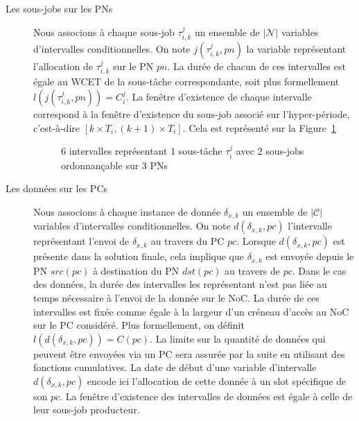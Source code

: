 \documentclass[main.tex]{subfiles}
\begin{document}
\begin{description}
    \item[Les sous-jobs sur les PNs]
        Nous associons à chaque sous-job $\tau_{i,k}^j$ un ensemble de $|\mathcal{N}|$ variables d'intervalles conditionnelles. On note $j( \tau_{i,k}^j , pn )$ la variable représentant l'allocation de $\tau_{i,k}^j$ sur le PN $pn$. La durée de chacun de ces intervalles est égale au WCET de la sous-tâche correspondante, soit plus formellement $l( j( \tau_{i,k}^j , pn ) ) = C_i^j$. La fenêtre d'existence de chaque intervalle correspond à la fenêtre d'existence du sous-job associé sur l'hyper-période, c'est-à-dire $[ k \times T_i , (k+1) \times T_i ]$. Cela est représenté sur la Figure~\ref{fig_resumeFr_decVarJobs}
        \begin{figure}
            \centering
            \scalebox{0.9}{}
            \caption{6 intervalles représentant 1 sous-tâche $\tau_i^j$ avec 2 sous-jobs ordonnançable sur 3 PNs}
            \label{fig_resumeFr_decVarJobs}
        \end{figure}


    \item[Les données sur les PCs]
        Nous associons à chaque instance de donnée $\delta_{x,k}$ un ensemble de $|\mathcal{C}|$ variables d'intervalles conditionnelles. On note $d( \delta_{x,k}, pc )$ l'intervalle représentant l'envoi de $\delta_{x,k}$ au travers du PC $pc$. Lorsque $d( \delta_{x,k}, pc )$ est présente dans la solution finale, cela implique que  $\delta_{x,k}$ est envoyée depuis le PN $src(pc)$ à destination du PN $dst(pc)$ au travers de $pc$. Dans le cas des données, la durée des intervalles les représentant n'est pas liée au temps nécessaire à l'envoi de la donnée sur le NoC. La durée de ces intervalles est fixée comme égale à la largeur d'un créneau d'accès au NoC sur le PC considéré. Plus formellement, on définit $l( d( \delta_{x,k}, pc ) ) = C(pc)$. La limite sur la quantité de données qui peuvent être envoyées via un PC sera assurée par la suite en utilisant des fonctions cumulatives. La date de début d'une variable d'intervalle $d( \delta_{x,k}, pc )$ encode ici l'allocation de cette donnée à un slot spécifique de son $pc$. La fenêtre d'existence des intervalles de données est égale à celle de leur sous-job producteur.
\end{description}
\end{document}
